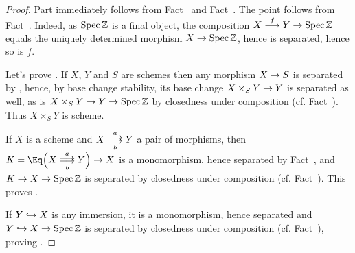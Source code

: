 \documentclass[a4paper,parskip=half,numbers=enddot, DIV=12]{scrreprt}
\begin{document}
\begin{proof}
    Part  immediately follows from Fact~ and Fact~. The point  follows from Fact~. Indeed, as $\operatorname{Spec}\mathbb{Z}$ is a final object, the composition $X\morphism[f]Y\morphism\Spec\IZ$ equals the uniquely determined morphism $X\morphism\Spec\IZ$, hence is separated, hence so is $f$.
    
    Let's prove . If $X$, $Y$ and $S$ are schemes then any morphism $X\morphism S$ is separated by , hence, by base change stability, its base change $X\times_S Y \morphism Y$ is separated as well, as is $X\times_S Y \morphism Y\morphism \Spec \IZ$ by closedness under composition (cf. Fact~). Thus $X\times_S Y$ is scheme. 
    
    If $X$ is a scheme and $X\doublemorphism[a][b] Y$ a pair of morphisms, then $K = \Eq\Big(X\doublemorphism[a][b] Y\Big) \morphism X$ is a monomorphism, hence separated by Fact~, and $K\morphism X\morphism \Spec \IZ$ is separated by closedness under composition (cf. Fact~). This proves .
    
    If $Y\monomorphism X$ is any immersion, it is a monomorphism, hence separated and $Y\monomorphism X\morphism \Spec \IZ$ is separated by closedness under composition (cf. Fact~), proving .
\end{proof}
\end{document}
